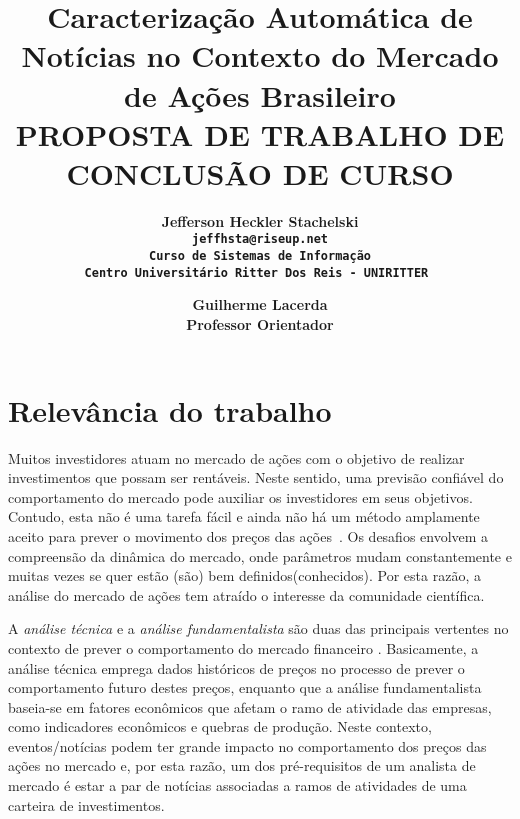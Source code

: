 \documentclass[11pt,a4paper]{article}
\begin{document}
\title{Caracterização Automática de Notícias no Contexto do Mercado de Ações Brasileiro \\ \smallskip
\small{ PROPOSTA DE TRABALHO DE CONCLUSÃO DE CURSO}}

\author{ \bf Jefferson Heckler Stachelski\\
    \tt jeffhsta@riseup.net \\
    Curso de Sistemas de Informação \\
    Centro Universitário Ritter Dos Reis - UNIRITTER
    \and
     \bf Guilherme Lacerda\\
    Professor Orientador\\
}

\maketitle
\thispagestyle{empty}

\section{Relevância do trabalho} \label{sec:intro}

Muitos investidores atuam no mercado de ações com o objetivo de realizar investimentos que possam ser rentáveis.
Neste sentido, uma previsão confiável do comportamento do mercado pode auxiliar os investidores em seus objetivos.
Contudo, esta não é uma tarefa fácil e ainda não há um método amplamente aceito para prever o movimento dos preços
das ações~\cite{Schumaker:2010}. Os desafios envolvem a compreensão da dinâmica do mercado, onde parâmetros mudam
constantemente e muitas vezes se quer estão (são) bem definidos(conhecidos). Por esta razão, a análise do mercado
de ações tem atraído o interesse da comunidade científica.

A \textit{análise técnica} e a \textit{análise fundamentalista} são duas das principais vertentes no contexto de
prever o comportamento do mercado financeiro \cite{Brum:acoes}. Basicamente, a análise técnica emprega dados históricos
de preços no processo de prever o comportamento futuro destes preços, enquanto que a análise fundamentalista baseia-se
em fatores econômicos que afetam o ramo de atividade das empresas, como indicadores econômicos e quebras de produção.
Neste contexto, eventos/notícias podem ter grande impacto no comportamento dos preços das ações no mercado e, por esta
razão, um dos pré-requisitos de um analista de mercado é estar a par de notícias associadas a ramos de atividades de
uma carteira de investimentos.
\end{document}
